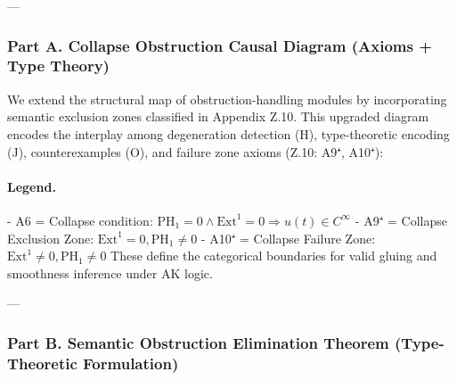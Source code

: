\documentclass[11pt]{article}
\begin{document}
\begin{axiom}
\begin{axiom}
{{---

\subsubsection*{Part A. Collapse Obstruction Causal Diagram (Axioms + Type Theory)}

We extend the structural map of obstruction-handling modules by incorporating semantic exclusion zones classified in Appendix Z.10.  
This upgraded diagram encodes the interplay among degeneration detection (H), type-theoretic encoding (J), counterexamples (O),  
and failure zone axioms (Z.10: A9⁺, A10⁺):

\begin{center}
\end{center}

\paragraph{Legend.}
- A6 = Collapse condition: \( \mathrm{PH}_1 = 0 \wedge \mathrm{Ext}^1 = 0 \Rightarrow u(t) \in C^\infty \)
- A9⁺ = Collapse Exclusion Zone: \( \mathrm{Ext}^1 = 0, \mathrm{PH}_1 \neq 0 \)  
- A10⁺ = Collapse Failure Zone: \( \mathrm{Ext}^1 \neq 0, \mathrm{PH}_1 \neq 0 \)  
These define the categorical boundaries for valid gluing and smoothness inference under AK logic.

---

\subsubsection*{Part B. Semantic Obstruction Elimination Theorem (Type-Theoretic Formulation)}

}}
\end{axiom}
\end{axiom}
\end{document}

